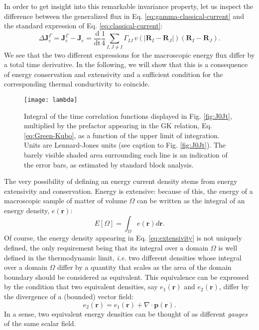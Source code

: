 In order to get insight into this remarkable invariance property, let
us inspect the difference between the generalized flux in Eq.
\eqref{eq:gamma-classical-current} and the standard expression of
Eq. \eqref{eq:classical-current}:
\begin{equation}
  \Delta\mathbf{J}_{e}^{\Gamma} =\mathbf{J}_{e}^{\Gamma}-\mathbf{J}_{e}
  =\frac{\mathrm{d}}{\mathrm{dt}}\frac{1}{4} \sum_{I, J\ne I}
    \Gamma_{IJ} \, v(|\mathbf{R}_{I}-\mathbf{R}_{J}|)
    (\mathbf{R}_{I}-\mathbf{R}_{J}). \label{eq:DeltaJ}
\end{equation}
We see that the two different expressions for the macroscopic energy
flux differ by a total time derivative. In the following, we will show
that this is a consequence of energy conservation and extensivity and
a sufficient condition for the corresponding thermal conductivity to coincide.

\begin{figure}
\centering
\texttt{[image: lambda]}
\caption{Integral of the time correlation functions displayed in
  Fig. \ref{fig:J0Jt}, multiplied by the prefactor appearing in the
  GK relation, Eq. \eqref{eq:Green-Kubo}, as a function of the upper
  limit of integration. Units are Lennard-Jones units (see caption to
  Fig. \ref{fig:J0Jt}). The barely visible shaded area surrounding
  each line is an indication of the error bars, as estimated by
  standard block analysis. \label{fig:lambda}}
\end{figure}


The very possibility of defining an energy current density stems from
energy extensivity and conservation. Energy is extensive: because of
this, the energy of a macroscopic sample of matter of volume $\Omega$
can be written as the integral of an energy density, $e(\mathbf{r})$:
\begin{equation}
  E[\Omega]=\int_{\Omega}e(\mathbf{r})d\mathbf{r}. \label{eq:extensivity}
\end{equation}
Of course, the energy density appearing in Eq. \eqref{eq:extensivity}
is not uniquely defined, the only requirement being that its integral
over a domain $\Omega$ is well defined in the thermodynamic limit,
\emph{i.e.} two different densities whose integral over a domain
$\Omega$ differ by a quantity that scales as the area of the domain
boundary should be considered as equivalent. This equivalence can be
expressed by the condition that two equivalent densities, say
$e_{1}(\mathbf{r})$ and $e_{2}(\mathbf{r})$, differ by the divergence
of a (bounded) vector field:
\begin{equation}
  e_{2}(\mathbf{r})=e_{1}(\mathbf{r})+\nabla\cdot
  \mathbf{p}(\mathbf{r}). \label{eq:gauge_transformation}
\end{equation}
In a sense, two equivalent energy densities can be thought of as
different \emph{gauges }of the same scalar field.

